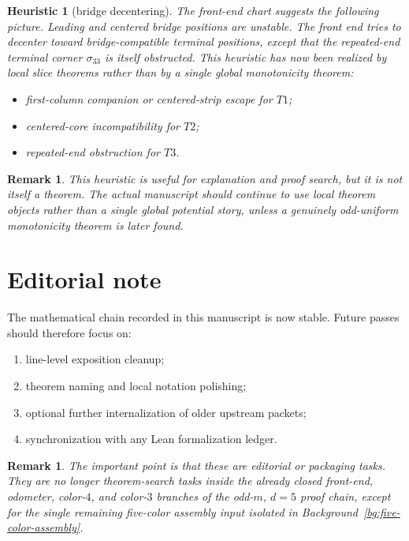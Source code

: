 \documentclass[11pt]{article}
\newtheorem{remark}[theorem]{Remark}
\newtheorem{heuristic}[theorem]{Heuristic}
\newcommand{\sig}[2]{\sigma_{#1#2}}
\begin{document}
\begin{heuristic}[bridge decentering]
The front-end chart suggests the following picture.
Leading and centered bridge positions are unstable.
The front end tries to decenter toward bridge-compatible terminal positions,
except that the repeated-end terminal corner \(\sig33\) is itself obstructed.
This heuristic has now been realized by local slice theorems rather than by a
single global monotonicity theorem:
\begin{itemize}[leftmargin=2.4em]
\item first-column companion or centered-strip escape for \(T1\);
\item centered-core incompatibility for \(T2\);
\item repeated-end obstruction for \(T3\).
\end{itemize}
\end{heuristic}

\begin{remark}
This heuristic is useful for explanation and proof search, but it is not itself
a theorem.
The actual manuscript should continue to use local theorem objects rather than a
single global potential story, unless a genuinely odd-uniform monotonicity
theorem is later found.
\end{remark}

\section{Editorial note}

The mathematical chain recorded in this manuscript is now stable.
Future passes should therefore focus on:
\begin{enumerate}[label=\textup{(\arabic*)},leftmargin=2.8em]
\item line-level exposition cleanup;
\item theorem naming and local notation polishing;
\item optional further internalization of older upstream packets;
\item synchronization with any Lean formalization ledger.
\end{enumerate}

\begin{remark}
The important point is that these are editorial or packaging tasks.
They are no longer theorem-search tasks inside the already closed front-end,
odometer, color-$4$, and color-$3$ branches of the odd-$m$, $d=5$ proof chain,
except for the single remaining five-color assembly input isolated in
Background~\ref{bg:five-color-assembly}.
\end{remark}
\end{document}
